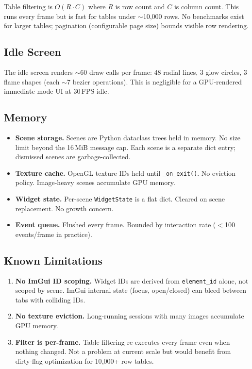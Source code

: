 \documentclass[a4paper,10pt]{article}
\newcommand{\field}[1]{\texttt{#1}}
\begin{document}
Table filtering is $O(R \cdot C)$ where $R$ is row count and $C$
is column count.  This runs every frame but is fast for tables
under $\sim$10{,}000 rows.  No benchmarks exist for larger tables;
pagination (configurable page size) bounds visible row rendering.

\subsection{Idle Screen}

The idle screen renders $\sim$60 draw calls per frame: 48 radial
lines, 3 glow circles, 3 flame shapes (each $\sim$7 bezier
operations).  This is negligible for a GPU-rendered immediate-mode
UI at 30\,FPS idle.

\subsection{Memory}

\begin{itemize}
  \item \textbf{Scene storage.}  Scenes are Python dataclass trees
    held in memory.  No size limit beyond the 16\,MiB message cap.
    Each scene is a separate dict entry; dismissed scenes are
    garbage-collected.
  \item \textbf{Texture cache.}  OpenGL texture IDs held until
    \texttt{\_on\_exit()}.  No eviction policy.  Image-heavy scenes
    accumulate GPU memory.
  \item \textbf{Widget state.}  Per-scene \texttt{WidgetState} is a
    flat dict.  Cleared on scene replacement.  No growth concern.
  \item \textbf{Event queue.}  Flushed every frame.  Bounded by
    interaction rate ($<$100 events/frame in practice).
\end{itemize}

\subsection{Known Limitations}

\begin{enumerate}
  \item \textbf{No ImGui ID scoping.}  Widget IDs are derived from
    \field{element\_id} alone, not scoped by scene.  ImGui internal
    state (focus, open/closed) can bleed between tabs with colliding
    IDs.
  \item \textbf{No texture eviction.}  Long-running sessions with
    many images accumulate GPU memory.
  \item \textbf{Filter is per-frame.}  Table filtering re-executes
    every frame even when nothing changed.  Not a problem at current
    scale but would benefit from dirty-flag optimization for
    10{,}000+ row tables.
\end{enumerate}
\end{document}
